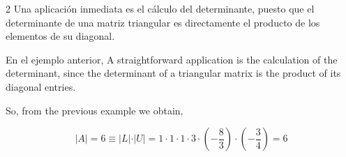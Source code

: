 \begin{paracol}{2}
Una aplicación inmediata es el cálculo del determinante, puesto que el determinante de una matriz triangular es directamente el producto de los elementos de su diagonal.

En el ejemplo anterior,
\switchcolumn
 A straightforward application is the calculation of the determinant, since the determinant of a triangular matrix is the product of its diagonal entries.
 
 So, from the previous example we obtain,
\end{paracol}
\begin{equation*}
\vert A \vert = 6 \equiv \vert L \vert\cdot\vert U\vert =1 \cdot 1 \cdot 1 \cdot 3 \cdot (-\frac{8}{3})\cdot (-\frac{3}{4})=6    
\end{equation*}

